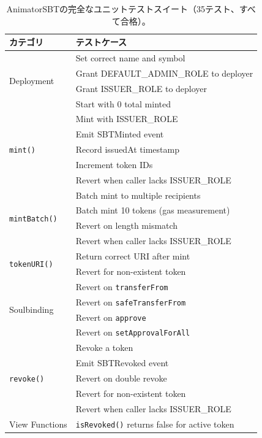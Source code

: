 \begin{table}[ht]
\centering
\caption{AnimatorSBTの完全なユニットテストスイート（35テスト、すべて合格）。}
\label{tab:test_results}
\footnotesize
\setlength{\tabcolsep}{2pt}
\begin{tabular}{@{}ll@{}}
\toprule
\textbf{カテゴリ} & \textbf{テストケース} \\
\midrule
\multirow{4}{*}{Deployment}
  & Set correct name and symbol \\
  & Grant DEFAULT\_ADMIN\_ROLE to deployer \\
  & Grant ISSUER\_ROLE to deployer \\
  & Start with 0 total minted \\
\midrule
\multirow{5}{*}{\texttt{mint()}}
  & Mint with ISSUER\_ROLE \\
  & Emit SBTMinted event \\
  & Record issuedAt timestamp \\
  & Increment token IDs \\
  & Revert when caller lacks ISSUER\_ROLE \\
\midrule
\multirow{4}{*}{\texttt{mintBatch()}}
  & Batch mint to multiple recipients \\
  & Batch mint 10 tokens (gas measurement) \\
  & Revert on length mismatch \\
  & Revert when caller lacks ISSUER\_ROLE \\
\midrule
\multirow{2}{*}{\texttt{tokenURI()}}
  & Return correct URI after mint \\
  & Revert for non-existent token \\
\midrule
\multirow{4}{*}{Soulbinding}
  & Revert on \texttt{transferFrom} \\
  & Revert on \texttt{safeTransferFrom} \\
  & Revert on \texttt{approve} \\
  & Revert on \texttt{setApprovalForAll} \\
\midrule
\multirow{5}{*}{\texttt{revoke()}}
  & Revoke a token \\
  & Emit SBTRevoked event \\
  & Revert on double revoke \\
  & Revert for non-existent token \\
  & Revert when caller lacks ISSUER\_ROLE \\
\midrule
\multirow{6}{*}{View Functions}
  & \texttt{isRevoked()} returns false for active token \\

\end{tabular}
\end{table}
